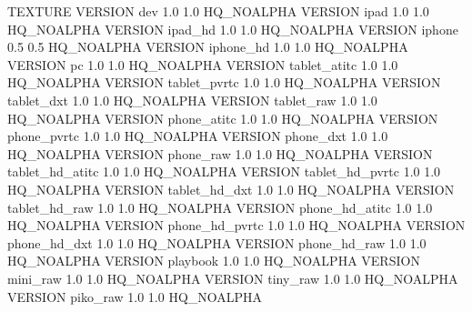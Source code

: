 TEXTURE
{
	VERSION dev				1.0 1.0		HQ_NOALPHA
	VERSION ipad			1.0 1.0 	HQ_NOALPHA
	VERSION ipad_hd			1.0 1.0 	HQ_NOALPHA
	VERSION iphone 			0.5 0.5 	HQ_NOALPHA
	VERSION iphone_hd		1.0 1.0		HQ_NOALPHA
	VERSION pc 				1.0 1.0 	HQ_NOALPHA
	VERSION tablet_atitc	1.0 1.0		HQ_NOALPHA
	VERSION tablet_pvrtc	1.0 1.0		HQ_NOALPHA
	VERSION tablet_dxt		1.0 1.0		HQ_NOALPHA
	VERSION tablet_raw		1.0 1.0		HQ_NOALPHA
	VERSION phone_atitc		1.0 1.0		HQ_NOALPHA
	VERSION phone_pvrtc		1.0 1.0		HQ_NOALPHA
	VERSION phone_dxt		1.0 1.0		HQ_NOALPHA
	VERSION phone_raw		1.0 1.0		HQ_NOALPHA
	VERSION tablet_hd_atitc	1.0 1.0		HQ_NOALPHA
	VERSION tablet_hd_pvrtc	1.0 1.0		HQ_NOALPHA
	VERSION tablet_hd_dxt	1.0 1.0		HQ_NOALPHA
	VERSION tablet_hd_raw	1.0 1.0		HQ_NOALPHA
	VERSION phone_hd_atitc	1.0 1.0		HQ_NOALPHA
	VERSION phone_hd_pvrtc	1.0 1.0		HQ_NOALPHA
	VERSION phone_hd_dxt	1.0 1.0		HQ_NOALPHA
	VERSION phone_hd_raw	1.0 1.0		HQ_NOALPHA
	VERSION playbook		1.0 1.0 	HQ_NOALPHA
	VERSION mini_raw		1.0 1.0		HQ_NOALPHA
	VERSION tiny_raw		1.0 1.0		HQ_NOALPHA
	VERSION piko_raw		1.0 1.0		HQ_NOALPHA
}
